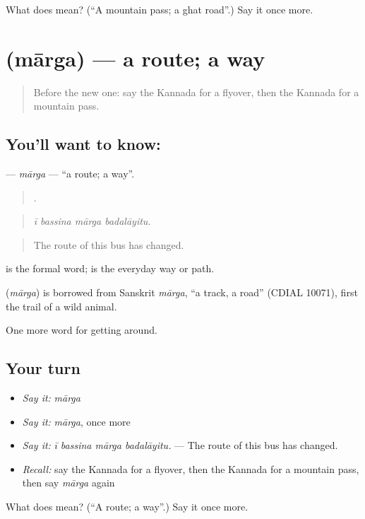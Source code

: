 \begin{tcolorbox}[breakable,colback=teal!4,colframe=teal!35!black,title={Before you move on}]
What does  mean? (\textquotedblleft{}A mountain pass; a ghat road\textquotedblright{}.) Say it once more.
\end{tcolorbox}
\section[\texorpdfstring{\kn{ಮಾರ್ಗ} (mārga)}{ಮಾರ್ಗ (mārga)}]{ (mārga) — a route; a way}

\label{lesson:KA-C442-marga}



\begin{quote}
Before the new one: say the Kannada for a flyover, then the Kannada for a mountain pass.
\end{quote}

\subsection*{You'll want to know: }
\textbf{} — \emph{mārga} — \textquotedblleft{}a route; a way\textquotedblright{}.

\begin{quote}
   .
\end{quote}

\begin{quote}
\emph{ī bassina mārga badalāyitu.}
\end{quote}

\begin{quote}
The route of this bus has changed.
\end{quote}

 is the formal word;  is the everyday way or path.

\begin{cousinweb}
\textbf{} (\emph{mārga}) is borrowed from Sanskrit \emph{mārga}, \textquotedblleft{}a track, a road\textquotedblright{} (CDIAL 10071), first the trail of a wild animal.
\end{cousinweb}

\begin{grammarlens}[title={What you've built}]
One more word for getting around.
\end{grammarlens}

\subsection*{Your turn}
\begin{itemize}
\raggedright
  \item \emph{Say it:} \emph{mārga}
  \item \emph{Say it:} \emph{mārga}, once more
  \item \emph{Say it:} \emph{ī bassina mārga badalāyitu.} — The route of this bus has changed.
  \item \emph{Recall:} say the Kannada for a flyover, then the Kannada for a mountain pass, then say \emph{mārga} again
\end{itemize}

\begin{tcolorbox}[breakable,colback=teal!4,colframe=teal!35!black,title={Before you move on}]
What does  mean? (\textquotedblleft{}A route; a way\textquotedblright{}.) Say it once more.
\end{tcolorbox}
